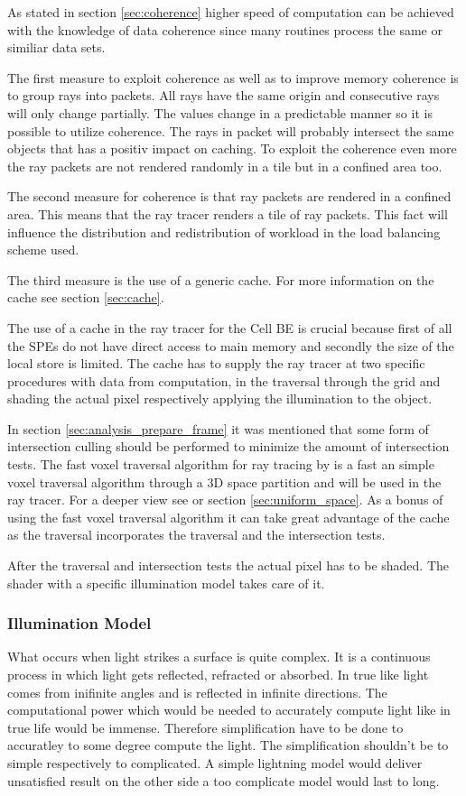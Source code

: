 \documentclass[DIV10, abstracton, openright, footsepline, headsepline, twoside, 9pt,
bigheadings]{scrreprt}
\begin{document}
As stated in section \ref{sec:coherence} higher speed of computation can
be achieved with the knowledge of data coherence since many routines
process the same or similiar data sets.

The first measure to exploit coherence as well as to improve memory
coherence is to group rays into packets. All rays have the same origin
and consecutive rays will only change partially. The values change in
a predictable manner so it is possible to utilize coherence. The rays
in packet will probably intersect the same objects that has a positiv
impact on caching.
To exploit the coherence even more the ray packets are not rendered
randomly in a tile but in a confined area too.


The second measure for coherence is that ray packets are rendered
in a confined area. This means that the ray tracer renders a tile
of ray packets. This fact will influence the distribution and
redistribution of workload in the load balancing scheme used.

The third measure is the use of a generic cache. For more information
on the cache see section \ref{sec:cache}.

The use of a cache in the ray tracer for the Cell BE is crucial because
first of all the SPEs do not have direct access to main memory
and secondly the size of the local store is limited. The cache
has to supply the ray tracer at two specific procedures with data
from computation, in the traversal through the grid and shading
the actual pixel respectively applying the illumination to the
object.

In section \ref{sec:analysis_prepare_frame} it was mentioned that some form
of intersection culling should be performed to minimize the amount
of intersection tests. The fast voxel traversal algorithm for ray
tracing by \cite{Woo87} is a fast an simple voxel traversal algorithm
through a 3D space partition and will be used in the ray tracer. For
a deeper view see \cite{Woo87} or section \ref{sec:uniform_space}. As
a bonus of using the fast voxel traversal algorithm it can take great
advantage of the cache as the traversal incorporates the traversal
and the intersection tests.


After the traversal and intersection tests the actual pixel has to
be shaded. The shader with a specific illumination model takes
care of it.

\subsubsection*{Illumination Model}
\label{sec:shading_model}
What occurs when light strikes a surface is quite complex. It is a
continuous process in which light gets reflected, refracted or absorbed.
In true like light comes from inifinite angles and is reflected in infinite
directions.  The computational power which would be needed to accurately
 compute light like in true life would be immense. Therefore simplification
have to be done to accuratley to some degree compute the light.
The simplification shouldn't be to simple respectively to complicated. A
simple lightning model would deliver unsatisfied result on the other
side a too complicate model would last to long.
\end{document}
